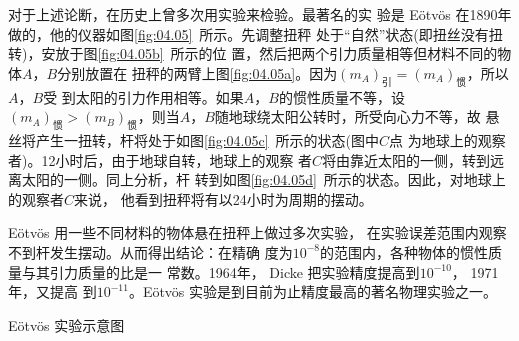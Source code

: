 对于上述论断，在历史上曾多次用实验来检验。最著名的实
验是 E\"otv\"os 在1890年做的，他的仪器如图\ref{fig:04.05}~所示。先调整扭秤
处于“自然”状态(即扭丝没有扭转)，安放于图\ref{fig:04.05b}~所示的位
置，然后把两个引力质量相等但材料不同的物体$ A $，$ B $分别放置在
扭秤的两臂上\lhbrak 图\ref{fig:04.05a}\rhbrak 。因为$(m _ { A }) _ {\text{引}} = (m _ { A }) _ {\text{惯}} $，所以$ A $，$ B $受
到太阳的引力作用相等。如果$ A $，$ B $的惯性质量不等，设$  (m _ { A }) _ {\text{惯}}  > (m _ { B }) _ {\text{惯}} $，则当$ A $，$ B $随地球绕太阳公转时，所受向心力不等，故
悬丝将产生一扭转，杆将处于如图\ref{fig:04.05c}~所示的状态(图中$ C $点
为地球上的观察者)。12小时后，由于地球自转，地球上的观察
者$ C $将由靠近太阳的一侧，转到远离太阳的一侧。同上分析，杆
转到如图\ref{fig:04.05d}~所示的状态。因此，对地球上的观察者$ C $来说，
他看到扭秤将有以24小时为周期的摆动。

E\"otv\"os 用一些不同材料的物体悬在扭秤上做过多次实验，
在实验误差范围内观察不到杆发生摆动。从而得出结论：在精确
度为$  1 0 ^ { - 8 }   $的范围内，各种物体的惯性质量与其引力质量的比是一
常数。1964年， Dicke 把实验精度提高到$  1 0 ^ { - 1 0 }  $， 1971 年，又提高
到$  1 0 ^ { - 1 1 }  $。E\"otv\"os 实验是到目前为止精度最高的著名物理实验之一。
\begin{figurex}[t]
	\centering
	 \qquad
	 \qquad
	\caption{E\"otv\"os 实验示意图}
	\label{fig:04.05}
\end{figurex}

